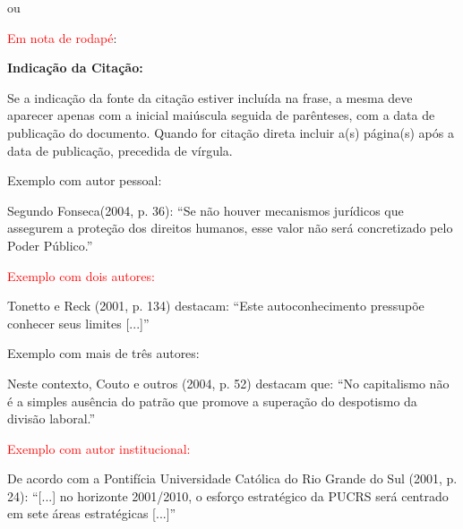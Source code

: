 \bigskip

{\color{red}
ou}

{\sffamily
\textrm{\textcolor{red}{Em nota de rodapé}}\textrm{:}}

\bigskip

{\centering\bfseries\color{red}
Indicação da Citação:
\par}

\bigskip

{\sffamily
\textrm{Se a indicação da fonte da citação estiver incluída na frase, a mesma deve aparecer apenas com a inicial
maiúscula seguida de parênteses, com a data de publicação do }\textrm{documento. Quando for citação direta incluir a(s)
página(s) após a data de publicação, precedida de vírgula.}}

\bigskip

{\color{red}
Exemplo com autor pessoal:}

\bigskip

Segundo Fonseca(2004, p. 36): ``Se não houver mecanismos jurídicos que assegurem a proteção dos direitos humanos, esse valor não será concretizado pelo Poder Público.''\\

\bigskip

{\sffamily
\textrm{\textcolor{red}{Exemplo com dois autores: }}}

\bigskip

Tonetto e Reck (2001, p. 134) destacam: ``Este autoconhecimento pressupõe conhecer seus limites
[...]'' \\

\bigskip

{\color{red}
Exemplo com mais de três autores:}

\bigskip

Neste contexto, Couto e outros (2004, p. 52) destacam que: ``No capitalismo não é a simples ausência do
patrão que promove a superação do despotismo da divisão laboral.''\\

\bigskip

{\sffamily
\textrm{\textcolor{red}{Exemplo com autor institucional: }}}

\bigskip

De acordo com a Pontifícia Universidade Católica do Rio Grande do Sul (2001, p. 24): ``[...] no horizonte 2001/2010, o esforço estratégico da PUCRS será centrado em sete áreas estratégicas [...]''\\

\bigskip

